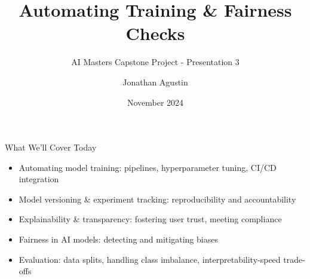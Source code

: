 \documentclass[aspectratio=169]{beamer}
\title{Automating Training \& Fairness Checks}
\subtitle{AI Masters Capstone Project - Presentation 3}
\author{Jonathan Agustin}
\date{November 2024}
\begin{document}

\maketitle


\begin{frame}{What We’ll Cover Today}
\begin{itemize}
\item Automating model training: pipelines, hyperparameter tuning, CI/CD integration
\item Model versioning \& experiment tracking: reproducibility and accountability
\item Explainability \& transparency: fostering user trust, meeting compliance
\item Fairness in AI models: detecting and mitigating biases
\item Evaluation: data splits, handling class imbalance, interpretability-speed trade-offs
\end{itemize}
\end{frame}
\end{document}
